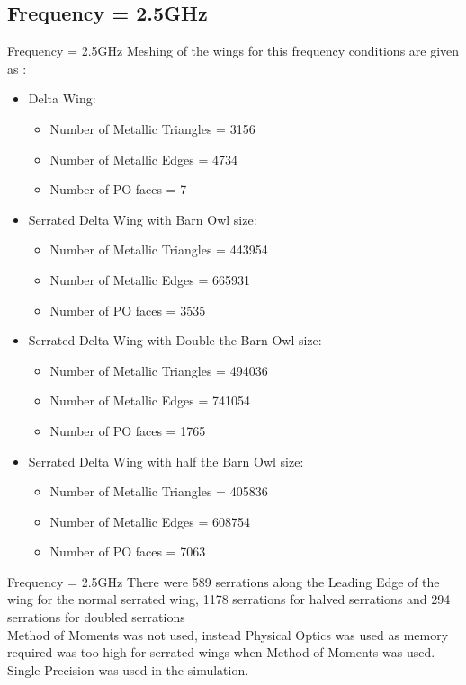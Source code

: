 \documentclass{beamer}
\begin{document}
\subsection{Frequency = 2.5GHz}
\begin{frame}{Frequency = 2.5GHz}
Meshing of the wings for this frequency conditions are given as :
\begin{itemize}
\item Delta Wing:
\begin{itemize}
	\item Number of Metallic Triangles = 3156
	\item Number of Metallic Edges = 4734
	\item Number of PO faces = 7
\end{itemize}
\item Serrated Delta Wing with Barn Owl size:
\begin{itemize}
\item Number of Metallic Triangles = 443954
\item Number of Metallic Edges = 665931
\item Number of PO faces = 3535
\end{itemize}
\item Serrated Delta Wing with Double the Barn Owl size:
\begin{itemize}
\item Number of Metallic Triangles = 494036
\item Number of Metallic Edges = 741054
\item Number of PO faces = 1765
\end{itemize}
\item Serrated Delta Wing with half the Barn Owl size:
\begin{itemize}
\item Number of Metallic Triangles = 405836
\item Number of Metallic Edges = 608754
\item Number of PO faces = 7063
\end{itemize}
\end{itemize}
\end{frame}

\begin{frame}{Frequency = 2.5GHz}
\justifying
There were 589 serrations along the Leading Edge of the wing for the normal serrated wing, 1178 serrations for halved serrations and 294 serrations for doubled serrations\\[0.2in]
Method of Moments was not used, instead Physical Optics was used as memory required was too high for serrated wings when Method of Moments was used. Single Precision was used in the simulation.\\
\end{frame}
\end{document}
